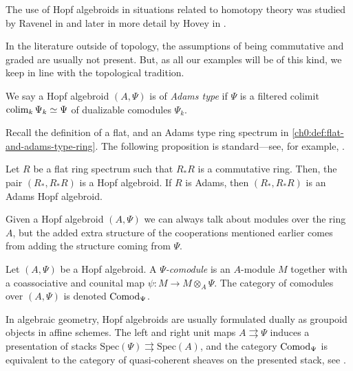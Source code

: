 The use of Hopf algebroids in situations related to homotopy theory was studied by Ravenel in \cite[A.1]{ravenel_86} and later in more detail by Hovey in \cite{hovey_04}. 


\begin{remark}
    In the literature outside of topology, the assumptions of being commutative and graded are usually not present. But, as all our examples will be of this kind, we keep in line with the topological tradition. 
\end{remark}

\begin{definition}
    \label{ch0:def:adams-hopf-algebroid}
    We say a Hopf algebroid $(A, \Psi)$ is of \emph{Adams type} if $\Psi$ is a filtered colimit $\operatorname{colim}_k \Psi_k \simeq \Psi$ of dualizable comodules $\Psi_k$.
\end{definition}


Recall the definition of a flat, and an Adams type ring spectrum in \cref{ch0:def:flat-and-adams-type-ring}. The following proposition is standard---see, for example, \cite[1.4.6]{hovey_04}. 

\begin{proposition}
    \label{ch0:prop:hopf-algebroid-from-spectra}
    Let $R$ be a flat ring spectrum such that $R_*R$ is a commutative ring. Then, the pair $(R_*, R_*R)$ is a Hopf algebroid. If $R$ is Adams, then $(R_*, R_*R)$ is an Adams Hopf algebroid. 
\end{proposition}

Given a Hopf algebroid $(A,\Psi)$ we can always talk about modules over the ring $A$, but the added extra structure of the cooperations mentioned earlier comes from adding the structure coming from $\Psi$. 

\begin{definition}
    \label{ch0:def:comodule-over-hopf-algebroid}
    Let $(A, \Psi)$ be a Hopf algebroid. A \emph{$\Psi$-comodule} is an $A$-module $M$ together with a coassociative and counital map $\psi\colon M\longrightarrow M\otimes_A \Psi$. The category of comodules over $(A, \Psi)$ is denoted \emph{$\mathrm{Comod}_\Psi$}. 
\end{definition}

\begin{remark}
    \label{ch0:rm:presenting-stacks}
    In algebraic geometry, Hopf algebroids are usually formulated dually as groupoid objects in affine schemes. The left and right unit maps $A\rightrightarrows \Psi$ induces a presentation of stacks $\mathrm{Spec}(\Psi)\rightrightarrows \mathrm{Spec}(A)$, and the category $\mathrm{Comod}_\Psi$ is equivalent to the category of quasi-coherent sheaves on the presented stack, see \cite[Thm 8]{naumann_07}. 
\end{remark}

